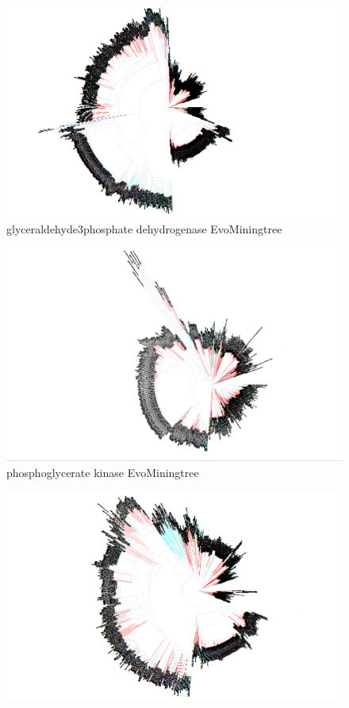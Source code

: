 \documentclass[12pt,twoside]{reedthesis}
\begin{document}
\begin{figure}[h!tbp]
  \includegraphics[angle = 180,scale = 0.25]{chapter5/tree11.png}
  \caption[glyceraldehyde3phosphate dehydrogenase EvoMiningtree]{\normalsize{glyceraldehyde3phosphate dehydrogenase EvoMiningtree}}
  \label{fig:glyceraldehyde3phosphate_dehydrogenase_evo_tree}
  \end{figure}\begin{figure}[h!tbp]
  \centering
  \includegraphics[angle = 180,scale = 0.25]{chapter5/tree12.png}
  \caption[phosphoglycerate kinase EvoMiningtree]{\normalsize{phosphoglycerate kinase EvoMiningtree}}
  \label{fig:phosphoglycerate_kinase_evo_tree}
  \end{figure}\begin{figure}[h!tbp]
  \centering
  \includegraphics[angle = 180,scale = 0.25]{chapter5/tree13.png}

\end{figure}
\end{document}
